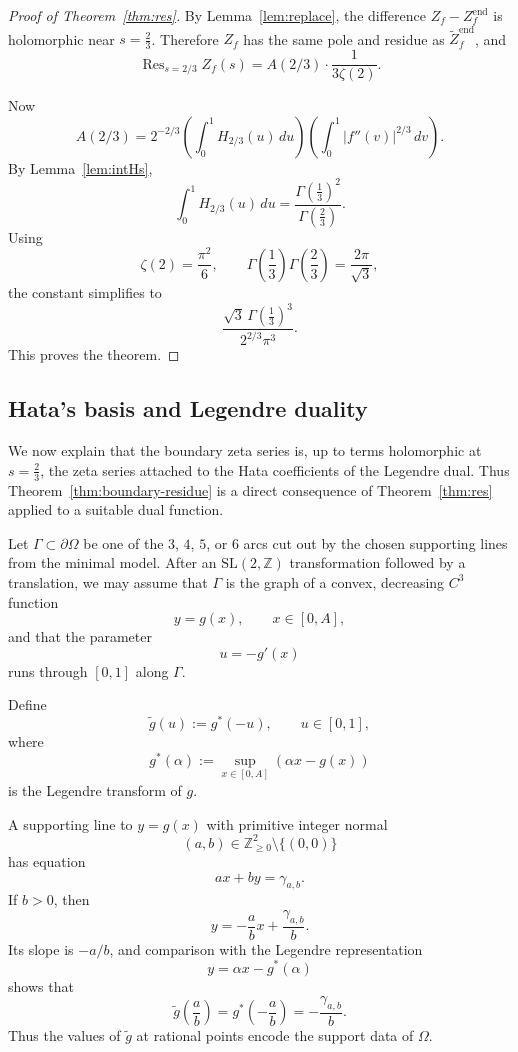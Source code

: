 \documentclass[a4paper,american,11pt]{amsart}
\theoremstyle{plain}
\theoremstyle{definition}
\newcommand{\Z}{\mathbb Z}
\DeclareMathOperator*{\Res}{Res}
\begin{document}
\begin{proof}[Proof of Theorem~\ref{thm:res}]
By Lemma~\ref{lem:replace}, the difference
\(Z_f-Z_f^{\mathrm{end}}\) is holomorphic near \(s=\frac23\).
Therefore \(Z_f\) has the same pole and residue as
\(\widetilde Z_f^{\mathrm{end}}\), and
\[
\Res_{s=2/3} Z_f(s)
=
A(2/3)\cdot\frac{1}{3\zeta(2)}.
\]

Now
\[
A(2/3)
=
2^{-2/3}
\left(\int_0^1 H_{2/3}(u)\,du\right)
\left(\int_0^1 |f''(v)|^{2/3}\,dv\right).
\]
By Lemma~\ref{lem:intHs},
\[
\int_0^1 H_{2/3}(u)\,du
=
\frac{\Gamma\!\left(\frac13\right)^2}
{\Gamma\!\left(\frac23\right)}.
\]
Using
\[
\zeta(2)=\frac{\pi^2}{6},
\qquad
\Gamma\!\left(\frac13\right)\Gamma\!\left(\frac23\right)
=
\frac{2\pi}{\sqrt3},
\]
the constant simplifies to
\[
\frac{\sqrt3\,\Gamma\!\left(\frac13\right)^3}{2^{2/3}\pi^3}.
\]
This proves the theorem.
\end{proof}

\subsection{Hata's basis and Legendre duality}

We now explain that the boundary zeta series is, up to terms holomorphic at
\(s=\frac23\), the zeta series attached to the Hata coefficients of the
Legendre dual. Thus Theorem~\ref{thm:boundary-residue} is a direct
consequence of Theorem~\ref{thm:res} applied to a suitable dual function.

Let \(\Gamma\subset \partial\Omega\) be one of the \(3\), \(4\), \(5\), or \(6\) arcs
cut out by the chosen supporting lines from the minimal model. After an
\(\mathrm{SL}(2,\Z)\) transformation followed by a translation, we may assume
that \(\Gamma\) is the graph of a convex, decreasing \(C^3\) function
\[
y=g(x),
\qquad
x\in[0,A],
\]
and that the parameter
\[
u=-g'(x)
\]
runs through \([0,1]\) along \(\Gamma\).

Define
\[
\widetilde g(u):=g^*(-u),
\qquad
u\in[0,1],
\]
where
\[
g^*(\alpha):=\sup_{x\in[0,A]}(\alpha x-g(x))
\]
is the Legendre transform of \(g\).

A supporting line to \(y=g(x)\) with primitive integer normal
\[
(a,b)\in \Z_{\ge 0}^2\setminus\{(0,0)\}
\]
has equation
\[
ax+by=\gamma_{a,b}.
\]
If \(b>0\), then
\[
y=-\frac abx+\frac{\gamma_{a,b}}{b}.
\]
Its slope is \(-a/b\), and comparison with the Legendre representation
\[
y=\alpha x-g^*(\alpha)
\]
shows that
\[
\widetilde g\!\left(\frac ab\right)
=
g^*\!\left(-\frac ab\right)
=
-\frac{\gamma_{a,b}}{b}.
\]
Thus the values of \(\widetilde g\) at rational points encode the support
data of \(\Omega\).
\end{document}

